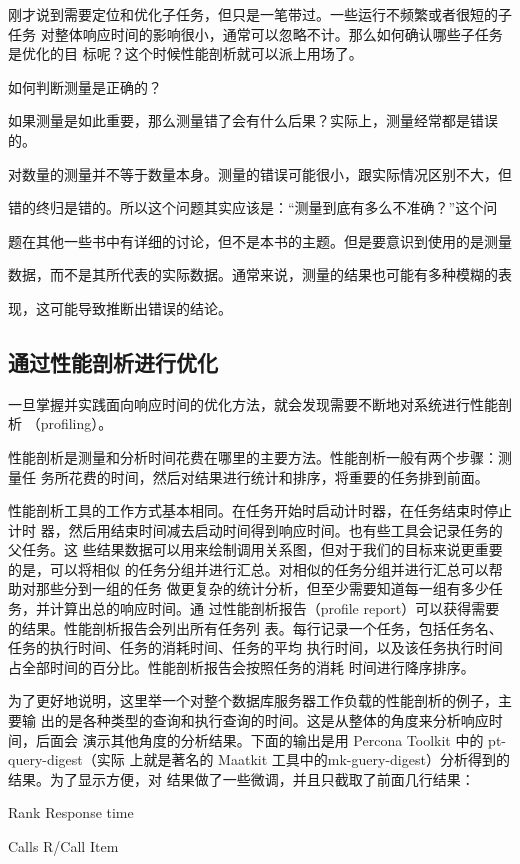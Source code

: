 刚才说到需要定位和优化子任务，但只是一笔带过。一些运行不频繁或者很短的子任务
对整体响应时间的影响很小，通常可以忽略不计。那么如何确认哪些子任务是优化的目
标呢？这个时候性能剖析就可以派上用场了。

如何判断测量是正确的？

如果测量是如此重要，那么测量错了会有什么后果？实际上，测量经常都是错误的。

对数量的测量并不等于数量本身。测量的错误可能很小，跟实际情况区别不大，但

错的终归是错的。所以这个问题其实应该是：“测量到底有多么不准确？”这个问

题在其他一些书中有详细的讨论，但不是本书的主题。但是要意识到使用的是测量

数据，而不是其所代表的实际数据。通常来说，测量的结果也可能有多种模糊的表

现，这可能导致推断出错误的结论。

\subsection{通过性能剖析进行优化}
一旦掌握并实践面向响应时间的优化方法，就会发现需要不断地对系统进行性能剖析
（profiling）。

性能剖析是测量和分析时间花费在哪里的主要方法。性能剖析一般有两个步骤：测量任
务所花费的时间，然后对结果进行统计和排序，将重要的任务排到前面。

性能剖析工具的工作方式基本相同。在任务开始时启动计时器，在任务结束时停止计时
器，然后用结束时间减去启动时间得到响应时间。也有些工具会记录任务的父任务。这
些结果数据可以用来绘制调用关系图，但对于我们的目标来说更重要的是，可以将相似
的任务分组并进行汇总。对相似的任务分组并进行汇总可以帮助对那些分到一组的任务
做更复杂的统计分析，但至少需要知道每一组有多少任务，并计算出总的响应时间。通
过性能剖析报告（profile report）可以获得需要的结果。性能剖析报告会列出所有任务列
表。每行记录一个任务，包括任务名、任务的执行时间、任务的消耗时间、任务的平均
执行时间，以及该任务执行时间占全部时间的百分比。性能剖析报告会按照任务的消耗
时间进行降序排序。

为了更好地说明，这里举一个对整个数据库服务器工作负载的性能剖析的例子，主要输
出的是各种类型的查询和执行查询的时间。这是从整体的角度来分析响应时间，后面会
演示其他角度的分析结果。下面的输出是用 Percona Toolkit 中的 pt-query-digest（实际
上就是著名的 Maatkit 工具中的mk-guery-digest）分析得到的结果。为了显示方便，对
结果做了一些微调，并且只截取了前面几行结果：

Rank Response time

Calls R/Call Item

